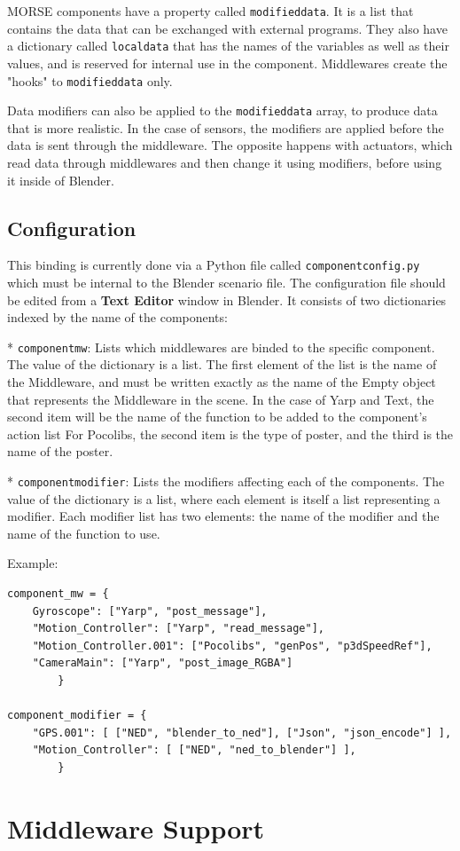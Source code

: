 \documentclass[twoside,a4paper,10pt]{report}
\newcommand{\dokutitlelevelone}[1]{\chapter{#1}}
\newcommand{\dokutitleleveltwo}[1]{\section{#1}}
\newcommand{\dokubold}[1]{\textbf{#1}}
\newcommand{\dokumonospace}[1]{\texttt{#1}}
\begin{document}
MORSE components have a property called \dokumonospace{modified{\textunderscore}data}. It is a list that contains the data that can be exchanged with external programs. They also have a dictionary called \dokumonospace{local{\textunderscore}data} that has the names of the variables as well as their values, and is reserved for internal use in the component. Middlewares create the "hooks" to \dokumonospace{modified{\textunderscore}data} only.

Data modifiers can also be applied to the \dokumonospace{modified{\textunderscore}data} array, to produce data that is more realistic. In the case of sensors, the modifiers are applied before the data is sent through the middleware. The opposite happens with actuators, which read data through middlewares and then change it using modifiers, before using it inside of Blender.


\dokutitleleveltwo{Configuration}
\label{ccd1066343c95877b75b79d47c36bebe}%

This binding is currently done via a Python file called \dokumonospace{component{\textunderscore}config.py}
which must be internal to the Blender scenario file. The configuration file should be edited from a \dokubold{Text Editor} window in Blender.
It consists of two dictionaries indexed by the name of the components:

* \dokumonospace{component{\textunderscore}mw}: Lists which middlewares are binded to the specific component. The value of the dictionary is a list. The first element of the list is the name of the Middleware, and must be written exactly as the name of the Empty object that represents the Middleware in the scene.
In the case of Yarp and Text, the second item will be the name of the function to be added to the component's action list For Pocolibs, the second item is the type of poster, and the third is the name of the poster.

* \dokumonospace{component{\textunderscore}modifier}: Lists the modifiers affecting each of the components. The value of the dictionary is a list, where each element is itself a list representing a modifier. Each modifier list has two elements: the name of the modifier and the name of the function to use.

Example:


\lstset{language=python}
\begin{lstlisting}
component_mw = {
	Gyroscope": ["Yarp", "post_message"],
	"Motion_Controller": ["Yarp", "read_message"],
	"Motion_Controller.001": ["Pocolibs", "genPos", "p3dSpeedRef"],
	"CameraMain": ["Yarp", "post_image_RGBA"]
		}

component_modifier = {
	"GPS.001": [ ["NED", "blender_to_ned"], ["Json", "json_encode"] ],
	"Motion_Controller": [ ["NED", "ned_to_blender"] ],
		}

\end{lstlisting}
\dokutitlelevelone{Middleware Support}
\label{4303941a1597ae94654bd96854480742}%
\label{9a05db9c4b60b0527010fd997682f523}%
\end{document}

